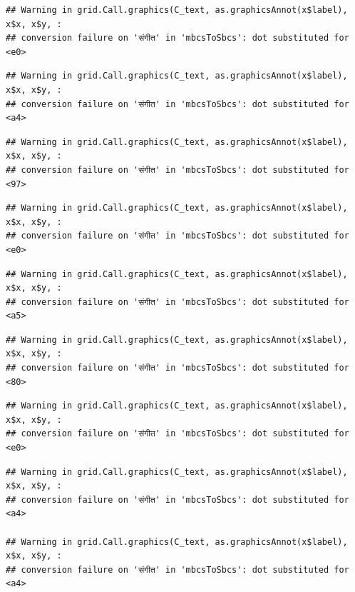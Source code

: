 \documentclass[
]{article}
\begin{document}
\begin{verbatim}
## Warning in grid.Call.graphics(C_text, as.graphicsAnnot(x$label), x$x, x$y, :
## conversion failure on 'संगीत' in 'mbcsToSbcs': dot substituted for <e0>
\end{verbatim}

\begin{verbatim}
## Warning in grid.Call.graphics(C_text, as.graphicsAnnot(x$label), x$x, x$y, :
## conversion failure on 'संगीत' in 'mbcsToSbcs': dot substituted for <a4>
\end{verbatim}

\begin{verbatim}
## Warning in grid.Call.graphics(C_text, as.graphicsAnnot(x$label), x$x, x$y, :
## conversion failure on 'संगीत' in 'mbcsToSbcs': dot substituted for <97>
\end{verbatim}

\begin{verbatim}
## Warning in grid.Call.graphics(C_text, as.graphicsAnnot(x$label), x$x, x$y, :
## conversion failure on 'संगीत' in 'mbcsToSbcs': dot substituted for <e0>
\end{verbatim}

\begin{verbatim}
## Warning in grid.Call.graphics(C_text, as.graphicsAnnot(x$label), x$x, x$y, :
## conversion failure on 'संगीत' in 'mbcsToSbcs': dot substituted for <a5>
\end{verbatim}

\begin{verbatim}
## Warning in grid.Call.graphics(C_text, as.graphicsAnnot(x$label), x$x, x$y, :
## conversion failure on 'संगीत' in 'mbcsToSbcs': dot substituted for <80>
\end{verbatim}

\begin{verbatim}
## Warning in grid.Call.graphics(C_text, as.graphicsAnnot(x$label), x$x, x$y, :
## conversion failure on 'संगीत' in 'mbcsToSbcs': dot substituted for <e0>
\end{verbatim}

\begin{verbatim}
## Warning in grid.Call.graphics(C_text, as.graphicsAnnot(x$label), x$x, x$y, :
## conversion failure on 'संगीत' in 'mbcsToSbcs': dot substituted for <a4>

## Warning in grid.Call.graphics(C_text, as.graphicsAnnot(x$label), x$x, x$y, :
## conversion failure on 'संगीत' in 'mbcsToSbcs': dot substituted for <a4>
\end{verbatim}
\end{document}
